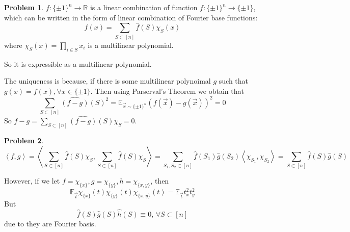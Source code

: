 \documentclass[a4paper]{article}
\theoremstyle{definition}
\newtheorem{problem}{Problem}
\theoremstyle{plain}
\newcommand{\Rbb}{\mathbb R}
\newcommand{\Ebb}{\mathbb E}
\newcommand{\dps}{\displaystyle}
\newcommand{\<}{\left<}
\renewcommand{\>}{\right>}
\numberwithin{equation}{problem}
\begin{document}
\begin{problem}
   $ f:\{\pm 1\}^n\rightarrow \Rbb $ is a linear combination of function  $ f:\{\pm 1\}^n\rightarrow \{\pm 1\} $, which can be written in the form of linear combination of Fourier base functions:
   \[f(x)=\sum_{S\subset [n]}\hat{f}(S)\chi_S(x)\]
   where  $ \dps\chi_S(x)=\prod_{i\in S}x_i $ is a multilinear polynomial.
   
   So it is expressible as a multilinear polynomial.

   The uniqueness is because, if there is some multilinear polynoimal  $ g $ such that  $ g(x)=f(x),\forall x\in\{\pm 1\} $. Then using Parserval's Theorem we obtain that 
   \[\sum_{S\subset [n]}\hat{(f-g)}(S)^2=\Ebb_{\vec{x}\sim\{\pm 1\}^n}(f(\vec{x})-g(\vec{x}))^2=0\]
   So  $ f-g=\dps\sum_{S\subset [n]}\hat{(f-g)}(S)\chi_S=0 $.   
\end{problem}
\begin{problem}
    \[\<f,g\>=\<\sum_{S\subset [n]}\hat{f}(S)\chi_S,\sum_{S\subset [n]}\hat{f}(S)\chi_S\>=\sum_{S_1,S_2\subset [n]}\hat{f}(S_1)\hat{g}(S_2)\<\chi_{S_1},\chi_{S_2}\>=\sum_{S\subset [n]}\hat{f}(S)\hat{g}(S)\]

    However, if we let  $ f=\chi_{\{x\}},g=\chi_{\{y\}},h=\chi_{\{x,y\}} $, then 
    \[\Ebb_{\vec{t}}\chi_{\{x\}}(t)\chi_{\{y\}}(t)\chi_{\{x,y\}}(t)=\Ebb_{\vec{t}}t_x^2t_y^2\]
    But 
    \[\hat{f}(S)\hat{g}(S)\hat{h}(S)\equiv 0,\,\forall S\subset [n]\]
    due to they are Fourier basis.
\end{problem}
\end{document}
